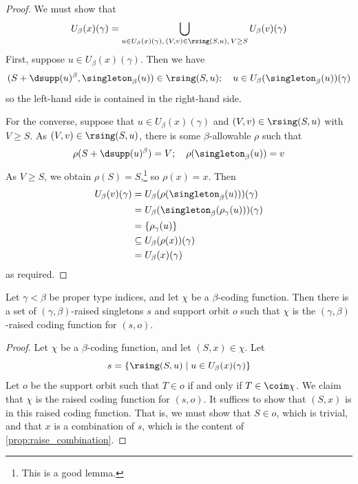 \begin{proof}
  We must show that
  \[ U_\beta(x)(\gamma) = \bigcup_{u \in U_\beta(x)(\gamma),\,(V,v) \in \rsing(S, u),\, V \geq S} U_\beta(v)(\gamma) \]
  First, suppose \( u \in U_\beta(x)(\gamma) \).
  Then we have
  \[ (S + \dsupp(u)^\beta, \singleton_\beta(u)) \in \rsing(S, u);\quad u \in U_\beta(\singleton_\beta(u))(\gamma) \]
  so the left-hand side is contained in the right-hand side.

  For the converse, suppose that \( u \in U_\beta(x)(\gamma) \) and \( (V, v) \in \rsing(S, u) \) with \( V \geq S \).
  As \( (V, v) \in \rsing(S, u) \), there is some \( \beta \)-allowable \( \rho \) such that
  \[ \rho(S + \dsupp(u)^\beta) = V;\quad \rho(\singleton_\beta(u)) = v \]
  As \( V \geq S \), we obtain \( \rho(S) = S \),\footnote{This is a good lemma.} so \( \rho(x) = x \).
  Then
  \begin{align*}
    U_\beta(v)(\gamma)
    &= U_\beta(\rho(\singleton_\beta(u)))(\gamma) \\
    &= U_\beta(\singleton_\beta(\rho_\gamma(u)))(\gamma) \\
    &= \{ \rho_\gamma(u) \} \\
    &\subseteq U_\beta(\rho(x))(\gamma) \\
    &= U_\beta(x)(\gamma)
  \end{align*}
  as required.
\end{proof}
\begin{proposition}
  \label{prop:recode}
  Let \( \gamma < \beta \) be proper type indices, and let \( \chi \) be a \( \beta \)-coding function.
  Then there is a set of \( (\gamma,\beta) \)-raised singletons \( s \) and support orbit \( o \) such that \( \chi \) is the \( (\gamma,\beta) \)-raised coding function for \( (s, o) \).
\end{proposition}
\begin{proof}
  Let \( \chi \) be a \( \beta \)-coding function, and let \( (S, x) \in \chi \).
  Let
  \[ s = \{ \rsing(S, u) \mid u \in U_\beta(x)(\gamma) \} \]
  Let \( o \) be the support orbit such that \( T \in o \) if and only if \( T \in \coim \chi \).
  We claim that \( \chi \) is the raised coding function for \( (s, o) \).
  It suffices to show that \( (S, x) \) is in this raised coding function.
  That is, we must show that \( S \in o \), which is trivial, and that \( x \) is a combination of \( s \), which is the content of \cref{prop:raise_combination}.
\end{proof}

